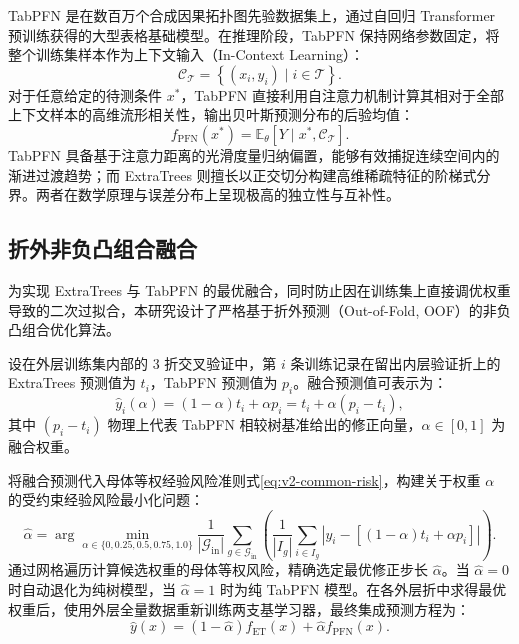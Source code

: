 TabPFN 是在数百万个合成因果拓扑图先验数据集上，通过自回归 Transformer 预训练获得的大型表格基础模型。在推理阶段，TabPFN 保持网络参数固定，将整个训练集样本作为上下文输入（In-Context Learning）：
\begin{equation}
\mathcal{C}_{\mathcal{T}} = \left\{ (x_i, y_i) \mid i \in \mathcal{T} \right\}.
\end{equation}
对于任意给定的待测条件 $x^*$，TabPFN 直接利用自注意力机制计算其相对于全部上下文样本的高维流形相关性，输出贝叶斯预测分布的后验均值：
\begin{equation}
f_{\mathrm{PFN}}(x^*) = \mathbb{E}_{\theta}\left[ Y \mid x^*, \mathcal{C}_{\mathcal{T}} \right].
\end{equation}
TabPFN 具备基于注意力距离的光滑度量归纳偏置，能够有效捕捉连续空间内的渐进过渡趋势；而 ExtraTrees 则擅长以正交切分构建高维稀疏特征的阶梯式分界。两者在数学原理与误差分布上呈现极高的独立性与互补性。

\subsection{折外非负凸组合融合}

为实现 ExtraTrees 与 TabPFN 的最优融合，同时防止因在训练集上直接调优权重导致的二次过拟合，本研究设计了严格基于折外预测（Out-of-Fold, OOF）的非负凸组合优化算法。

设在外层训练集内部的 3 折交叉验证中，第 $i$ 条训练记录在留出内层验证折上的 ExtraTrees 预测值为 $t_i$，TabPFN 预测值为 $p_i$。融合预测值可表示为：
\begin{equation}
\widehat y_i(\alpha) = (1 - \alpha) t_i + \alpha p_i = t_i + \alpha (p_i - t_i),
\end{equation}
其中 $(p_i - t_i)$ 物理上代表 TabPFN 相较树基准给出的修正向量，$\alpha \in [0, 1]$ 为融合权重。

将融合预测代入母体等权经验风险准则式\eqref{eq:v2-common-risk}，构建关于权重 $\alpha$ 的受约束经验风险最小化问题：
\begin{equation}
\widehat\alpha = \arg\min_{\alpha \in \{0, 0.25, 0.5, 0.75, 1.0\}} \frac{1}{|\mathcal{G}_{\mathrm{in}}|} \sum_{g \in \mathcal{G}_{\mathrm{in}}} \left( \frac{1}{|I_g|} \sum_{i \in I_g} \left| y_i - \left[ (1 - \alpha) t_i + \alpha p_i \right] \right| \right).
\label{eq:v2-blend-selection}
\end{equation}
通过网格遍历计算候选权重的母体等权风险，精确选定最优修正步长 $\widehat\alpha$。当 $\widehat\alpha = 0$ 时自动退化为纯树模型，当 $\widehat\alpha = 1$ 时为纯 TabPFN 模型。在各外层折中求得最优权重后，使用外层全量数据重新训练两支基学习器，最终集成预测方程为：
\begin{equation}
\widehat y(x) = (1 - \widehat\alpha) f_{\mathrm{ET}}(x) + \widehat\alpha f_{\mathrm{PFN}}(x).
\label{eq:v2-prediction-blend}
\end{equation}

